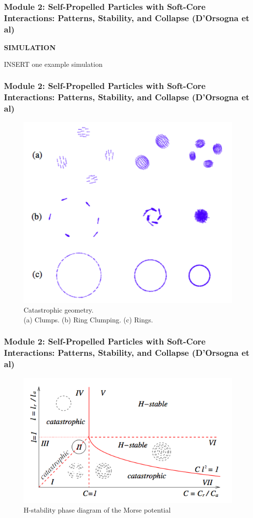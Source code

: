 \documentclass[compress]{beamer}
\begin{document}
\begin{frame}
	\frametitle{Module 2: Self-Propelled Particles with Soft-Core Interactions: Patterns, Stability, and Collapse (D'Orsogna et al)}
	
	\textbf{SIMULATION}
	
	INSERT one example simulation
	
\end{frame}


\begin{frame}
	\frametitle{Module 2: Self-Propelled Particles with Soft-Core Interactions: Patterns, Stability, and Collapse (D'Orsogna et al)}
	
	
	\begin{figure}[H]
		\includegraphics[width=.6\columnwidth]{./img/ClumpsRing.png}
		\caption{Catastrophic geometry. \\(a) Clumps. (b) Ring Clumping. (c) Rings.}
		\label{clumps}
	\end{figure}
	
\end{frame}



\begin{frame}
  \frametitle{Module 2: Self-Propelled Particles with Soft-Core Interactions: Patterns, Stability, and Collapse (D'Orsogna et al)}
	
	
	\begin{figure}[H]
		\includegraphics[width=.9\columnwidth]{./img/H-stabilityPhaseDiagram.png}
		\caption{H-stability phase diagram of the Morse potential}
		\label{hstability}
	\end{figure}
	
\end{frame}
\end{document}
